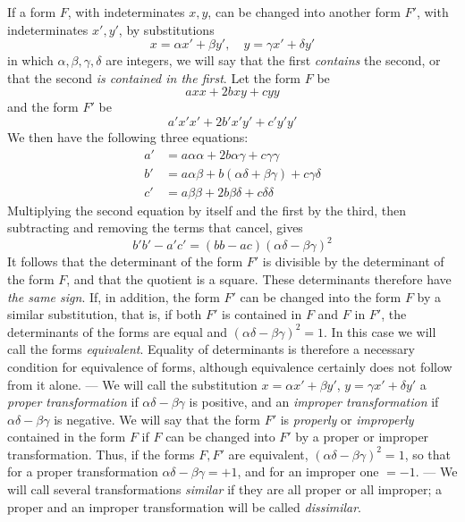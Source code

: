 If a form $F$, with indeterminates $x,y$, can be changed into another form $F'$, with indeterminates $x',y'$, by substitutions
\[
x=\alpha x'+\beta y',\quad y=\gamma x'+\delta y'
\]
in which $\alpha,\beta,\gamma,\delta$ are integers, we will say that the first \textit{contains} the second, or that the second \textit{is contained in the first}. Let the form $F$ be
\[
axx+2bxy+cyy
\]
and the form $F'$ be
\[
a'x'x'+2b'x'y'+c'y'y'
\]
We then have the following three equations:
\[
\begin{aligned}
a'&=a\alpha\alpha+2b\alpha\gamma+c\gamma\gamma\\
b'&=a\alpha\beta+b(\alpha\delta+\beta\gamma)+c\gamma\delta\\
c'&=a\beta\beta+2b\beta\delta+c\delta\delta
\end{aligned}
\]
Multiplying the second equation by itself and the first by the third, then subtracting and removing the terms that cancel, gives
\[
b'b'-a'c'=(bb-ac)(\alpha\delta-\beta\gamma)^2
\]
It follows that the determinant of the form $F'$ is divisible by the determinant of the form $F$, and that the quotient is a square. These determinants therefore have \textit{the same sign}. If, in addition, the form $F'$ can be changed into the form $F$ by a similar substitution, that is, if both $F'$ is contained in $F$ and $F$ in $F'$,
the determinants of the forms are equal and $(\alpha\delta-\beta\gamma)^2=1$. In this case we will call the forms \textit{equivalent}. Equality of determinants is therefore a necessary condition for equivalence of forms, although equivalence certainly does not follow from it alone. --- We will call the substitution $x=\alpha x'+\beta y'$, $y=\gamma x'+\delta y'$ a \textit{proper transformation} if $\alpha\delta-\beta\gamma$ is positive, and an \textit{improper transformation} if $\alpha\delta-\beta\gamma$ is negative. We will say that the form $F'$ is \textit{properly} or \textit{improperly} contained in the form $F$ if $F$ can be changed into $F'$ by a proper or improper transformation. Thus, if the forms $F,F'$ are equivalent, $(\alpha\delta-\beta\gamma)^2=1$, so that for a proper transformation $\alpha\delta-\beta\gamma=+1$, and for an improper one $=-1$. --- We will call several transformations \textit{similar} if they are all proper or all improper; a proper and an improper transformation will be called \textit{dissimilar}.

